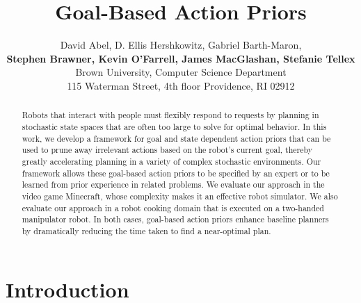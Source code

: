 \documentclass[letterpaper]{article}
\begin{document}
\title{Goal-Based Action Priors}

\author{David Abel, D. Ellis Hershkowitz, Gabriel Barth-Maron, \\ {\Large {\bf Stephen Brawner, Kevin O'Farrell, James MacGlashan, Stefanie Tellex}}\\
Brown University, Computer Science Department\\
115 Waterman Street, 4th floor
Providence, RI 02912
}

\maketitle

\begin{abstract}
Robots that interact with people must flexibly respond to
requests by planning in stochastic state spaces that are often too large to solve for optimal behavior.
In this work, we develop a framework for goal and state dependent
action priors that can be used to prune away irrelevant actions based on the
robot's current goal, thereby greatly accelerating planning in a variety of
complex stochastic environments. Our framework allows these goal-based action priors to be
specified by an expert or to be learned from prior experience in related
problems. We evaluate our approach in the video game Minecraft, whose complexity
makes it an effective robot simulator. We also evaluate our approach in a robot cooking domain that
is executed on a two-handed manipulator robot. In both cases, goal-based action priors enhance
baseline planners by dramatically reducing the time taken to find a near-optimal plan.
\end{abstract}


\section{Introduction}
\label{sec:introduction}
\end{document}
